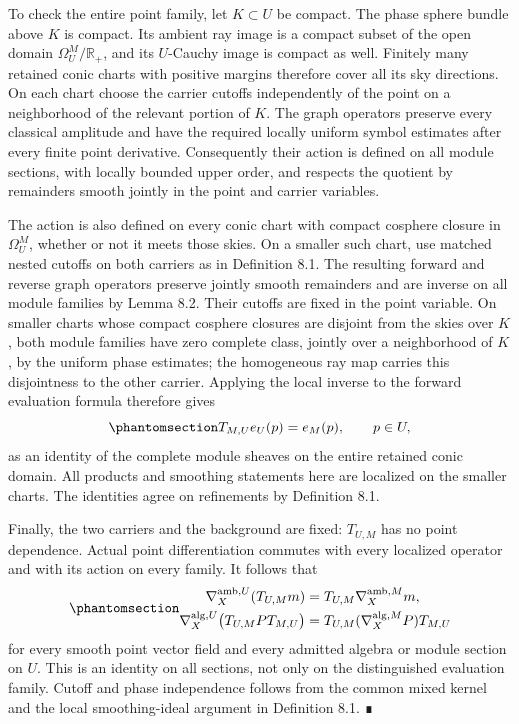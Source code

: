 \documentclass[
  english,
  11pt,
  reqno]{amsart}
\begin{document}
To check the entire point family, let \(K\subset U\) be compact. The
phase sphere bundle above \(K\) is compact. Its ambient ray image is a
compact subset of the open domain \(\Omega_U^M/\mathbb R_+\), and its
\(U\)-Cauchy image is compact as well. Finitely many retained conic
charts with positive margins therefore cover all its sky directions. On
each chart choose the carrier cutoffs independently of the point on a
neighborhood of the relevant portion of \(K\). The graph operators
preserve every classical amplitude and have the required locally uniform
symbol estimates after every finite point derivative. Consequently their
action is defined on all module sections, with locally bounded upper
order, and respects the quotient by remainders smooth jointly in the
point and carrier variables.

The action is also defined on every conic chart with compact cosphere
closure in \(\Omega_U^M\), whether or not it meets those skies. On a
smaller such chart, use matched nested cutoffs on both carriers as in
Definition 8.1. The resulting forward and reverse graph operators
preserve jointly smooth remainders and are inverse on all module
families by Lemma 8.2. Their cutoffs are fixed in the point variable. On
smaller charts whose compact cosphere closures are disjoint from the
skies over \(K\), both module families have zero complete class, jointly
over a neighborhood of \(K\), by the uniform phase estimates; the
homogeneous ray map carries this disjointness to the other carrier.
Applying the local inverse to the forward evaluation formula therefore
gives
\begin{equation}\protect\phantomsection\label{eq:relative-inverse-full-evaluation}{
T_{M,U}e_U(p)=e_M(p),\qquad p\in U,
}\end{equation} as an identity of the complete module sheaves on the
entire retained conic domain. All products and smoothing statements here
are localized on the smaller charts. The identities agree on refinements
by Definition 8.1.

Finally, the two carriers and the background are fixed: \(T_{U,M}\) has
no point dependence. Actual point differentiation commutes with every
localized operator and with its action on every family. It follows that
\begin{equation}\protect\phantomsection\label{eq:relative-all-section-connections}{
\begin{aligned}
\nabla_X^{\mathrm{amb},U}(T_{U,M}m)
 &=T_{U,M}\nabla_X^{\mathrm{amb},M}m,\\
\nabla_X^{\mathrm{alg},U}
  \bigl(T_{U,M}PT_{M,U}\bigr)
 &=T_{U,M}(\nabla_X^{\mathrm{alg},M}P)T_{M,U}
\end{aligned}
}\end{equation} for every smooth point vector field and every admitted
algebra or module section on \(U\). This is an identity on all sections,
not only on the distinguished evaluation family. Cutoff and phase
independence follows from the common mixed kernel and the local
smoothing-ideal argument in Definition 8.1. ∎
\end{document}
